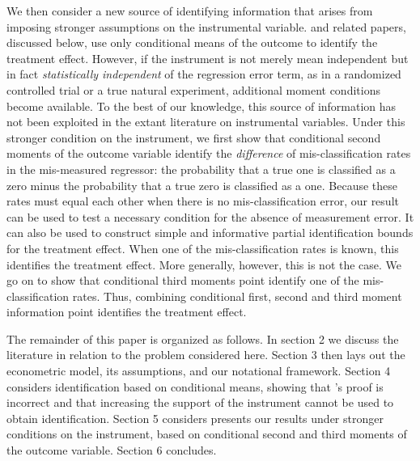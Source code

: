 We then consider a new source of identifying information that arises from imposing stronger assumptions on the instrumental variable.
\cite{Mahajan} and related papers, discussed below, use only conditional means of the outcome to identify the treatment effect.
However, if the instrument is not merely mean independent but in fact \emph{statistically independent} of the regression error term, as in a randomized controlled trial or a true natural experiment, additional moment conditions become available.
To the best of our knowledge, this source of information has not been exploited in the extant literature on instrumental variables.  
Under this stronger condition on the instrument, we first show that conditional second moments of the outcome variable identify the \emph{difference} of mis-classification rates in the mis-measured regressor: the probability that a true one is classified as a zero minus the probability that a true zero is classified as a one.
Because these rates must equal each other when there is no mis-classification error, our result can be used to test a necessary condition for the absence of measurement error.   
It can also be used to construct simple and informative partial identification bounds for the treatment effect.
When one of the mis-classification rates is known, this identifies the treatment effect.
More generally, however, this is not the case.
We go on to show that conditional third moments point identify one of the mis-classification rates.
Thus, combining conditional first, second and third moment information point identifies the treatment effect.

The remainder of this paper is organized as follows. 
In section 2 we discuss the literature in relation to the problem considered here. 
Section 3 then lays out the econometric model, its assumptions, and our notational framework. 
Section 4 considers identification based on conditional means, showing that \citeauthor{Mahajan}'s proof is incorrect and that increasing the support of the instrument cannot be used to obtain identification.
Section 5 considers presents our results under stronger conditions on the instrument, based on conditional second and third moments of the outcome variable.
Section 6 concludes.  

 


